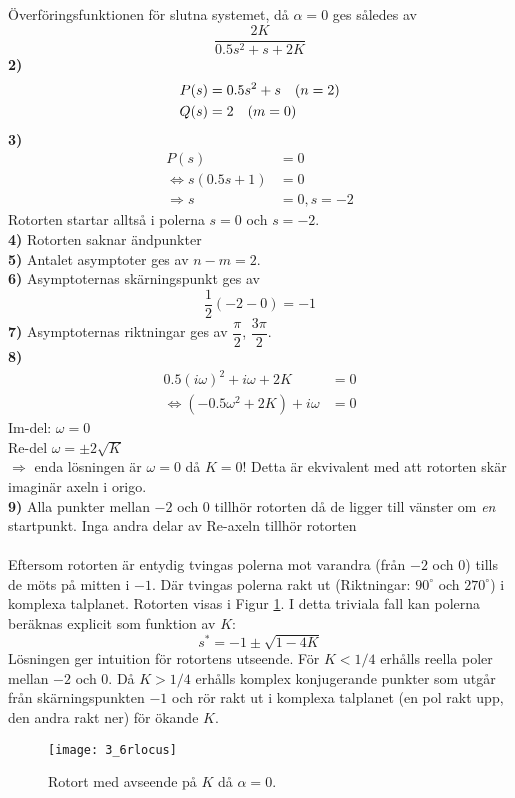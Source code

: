 \documentclass[12pt]{article}
\begin{document}
Överföringsfunktionen för slutna systemet, då $\alpha = 0$ ges således av
\[\frac{2K}{0.5s^2 + s + 2K}\]
\textbf{2)} \\
\begin{align*}
  P(s) &= 0.5s^2 + s \hspace*{10pt} (n = 2) \\
  Q(s) &= 2 \hspace*{10pt} (m = 0)
\end{align*}
\textbf{3)} \\
\begin{align*}
  P(s) &= 0 \\
  \Leftrightarrow s(0.5s+1) &= 0 \\
  \Rightarrow s &= 0, s = -2
\end{align*}
Rotorten startar alltså i polerna $s = 0$ och $s = -2$. \\
\textbf{4)} Rotorten saknar ändpunkter \\
\textbf{5)} Antalet asymptoter ges av $n-m = 2$. \\
\textbf{6)} Asymptoternas skärningspunkt ges av
\[\frac{1}{2}(-2-0) = -1\]
\textbf{7)} Asymptoternas riktningar ges av $\dfrac{\pi}{2}$, $\dfrac{3\pi}{2}$. \\
\textbf{8)} 
\begin{align*}
  0.5(i\omega)^2 + i\omega + 2K &= 0 \\
  \Leftrightarrow (-0.5\omega^2 + 2K) + i\omega &= 0
\end{align*}
Im-del: $\omega = 0$ \\
Re-del $\omega = \pm 2\sqrt{K}$ \\
$\Rightarrow$ enda lösningen är $\omega = 0$ då $K = 0$! Detta är ekvivalent med att rotorten skär imaginär axeln i origo. \\
\textbf{9)} Alla punkter mellan $-2$ och $0$ tillhör rotorten då de ligger till vänster om \emph{en} startpunkt. Inga andra delar av Re-axeln tillhör rotorten\\\\
Eftersom rotorten är entydig tvingas polerna mot varandra (från $-2$ och $0$) tills de möts på mitten i $-1$. Där tvingas polerna rakt ut (Riktningar: $90^{\circ}$ och $270^{\circ}$)  i komplexa talplanet. Rotorten visas i Figur \ref{fig:36rlocus}. I detta triviala fall kan polerna beräknas explicit som funktion av $K$:
\[s^* = -1 \pm \sqrt{1-4K}\]
Lösningen ger intuition för rotortens utseende. För $K < 1/4$ erhålls reella poler mellan $-2$ och $0$. Då $K > 1/4$ erhålls komplex konjugerande punkter som utgår från skärningspunkten $-1$ och rör rakt ut i komplexa talplanet (en pol rakt upp, den andra rakt ner) för ökande $K$.
\begin{figure}[h!]
  \centering
  \texttt{[image: 3\_6rlocus]}
  \caption{Rotort med avseende på $K$ då $\alpha = 0$.}
  \label{fig:36rlocus}
\end{figure}
\FloatBarrier
\end{document}
